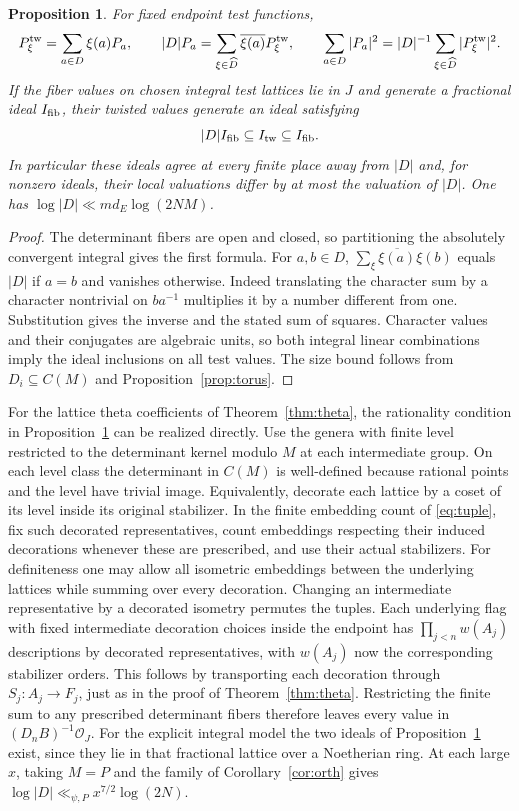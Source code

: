 \documentclass[a4paper,11pt]{article}
\newtheorem{proposition}{Proposition}[section]
\theoremstyle{definition}
\theoremstyle{remark}
\numberwithin{equation}{section}
\newcommand{\OO}{\mathcal O}
\begin{document}
\begin{proposition}\label{prop:four}
For fixed endpoint test functions,
\[
 P_\xi^{\rm tw}=\sum_{a\in D}\xi(a)P_a,\qquad
 |D| P_a=\sum_{\xi\in\widehat D}\overline{\xi(a)}P_\xi^{\rm tw},\qquad
 \sum_{a\in D}|P_a|^2=|D|^{-1}\sum_{\xi\in\widehat D}|P_\xi^{\rm tw}|^2.
\]
If the fiber values on chosen integral test lattices lie in \(J\) and generate a fractional ideal \(I_{\rm fib}\), their twisted values generate an ideal satisfying
\[
             |D|I_{\rm fib}\subseteq I_{\rm tw}\subseteq I_{\rm fib}.
\]
In particular these ideals agree at every finite place away from \(|D|\) and, for nonzero ideals, their local valuations differ by at most the valuation of \(|D|\). One has \(\log |D|\ll m d_E\log(2NM)\).
\end{proposition}
\begin{proof}
The determinant fibers are open and closed, so partitioning the absolutely convergent integral gives the first formula. For \(a,b\in D\), \(\sum_\xi\overline{\xi(a)}\xi(b)\) equals \(|D|\) if \(a=b\) and vanishes otherwise. Indeed translating the character sum by a character nontrivial on \(ba^{-1}\) multiplies it by a number different from one. Substitution gives the inverse and the stated sum of squares. Character values and their conjugates are algebraic units, so both integral linear combinations imply the ideal inclusions on all test values. The size bound follows from \(D_i\subseteq C(M)\) and Proposition~\ref{prop:torus}.
\end{proof}

For the lattice theta coefficients of Theorem~\ref{thm:theta}, the rationality condition in Proposition~\ref{prop:four} can be realized directly. Use the genera with finite level restricted to the determinant kernel modulo \(M\) at each intermediate group. On each level class the determinant in \(C(M)\) is well-defined because rational points and the level have trivial image. Equivalently, decorate each lattice by a coset of its level inside its original stabilizer. In the finite embedding count of \eqref{eq:tuple}, fix such decorated representatives, count embeddings respecting their induced decorations whenever these are prescribed, and use their actual stabilizers. For definiteness one may allow all isometric embeddings between the underlying lattices while summing over every decoration. Changing an intermediate representative by a decorated isometry permutes the tuples. Each underlying flag with fixed intermediate decoration choices inside the endpoint has \(\prod_{j<n} w(A_j)\) descriptions by decorated representatives, with \(w(A_j)\) now the corresponding stabilizer orders. This follows by transporting each decoration through \(S_j:A_j\to F_j\), just as in the proof of Theorem~\ref{thm:theta}. Restricting the finite sum to any prescribed determinant fibers therefore leaves every value in \((D_nB)^{-1}\OO_J\). For the explicit integral model the two ideals of Proposition~\ref{prop:four} exist, since they lie in that fractional lattice over a Noetherian ring. At each large \(x\), taking \(M=P\) and the family of Corollary~\ref{cor:orth} gives \(\log|D|\ll_{\psi,P} x^{7/2}\log(2N)\).
\end{document}
